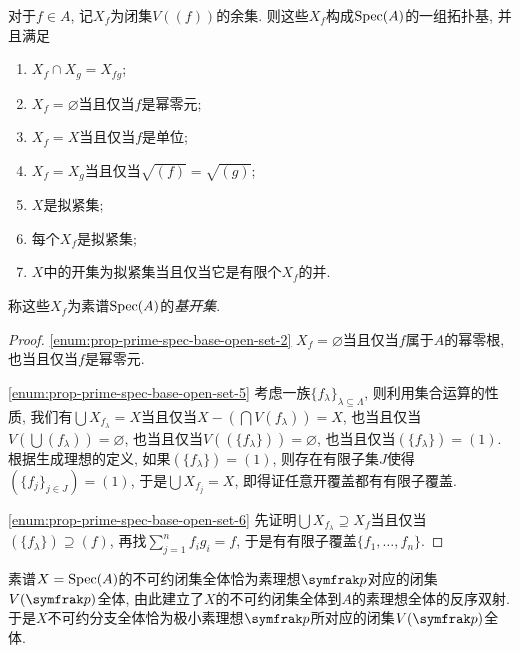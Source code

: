 \begin{proposition}\label{prop:primespecbaseopenset}
  对于$f\in A$, 记$X_f$为闭集$V((f))$的余集. 则这些$X_f$构成$\operatorname{Spec} (A)$的一组拓扑基, 并且满足
  \begin{enumerate}
    \item $X_f\cap X_g=X_{fg}$;
    \item\label{enum:prop-prime-spec-base-open-set-2} $X_f=\varnothing$当且仅当$f$是幂零元;
    \item $X_f=X$当且仅当$f$是单位;
    \item $X_f=X_g$当且仅当$\sqrt{(f)}=\sqrt{(g)}$;
    \item\label{enum:prop-prime-spec-base-open-set-5} $X$是拟紧集\footnotemark;
    \item\label{enum:prop-prime-spec-base-open-set-6} 每个$X_f$是拟紧集;
    \item $X$中的开集为拟紧集当且仅当它是有限个$X_f$的并.
  \end{enumerate}
  称这些$X_f$为素谱$\operatorname{Spec} (A)$的\emph{基开集}.
\end{proposition}

\begin{proof}
  \ref{enum:prop-prime-spec-base-open-set-2} $X_f=\varnothing$当且仅当$f$属于$A$的幂零根, 也当且仅当$f$是幂零元.

  \ref{enum:prop-prime-spec-base-open-set-5} 考虑一族$\{f_\lambda\}_{\lambda\subseteq \Lambda}$, 则利用集合运算的性质, 我们有$\bigcup X_{f_\lambda}=X$当且仅当$X-(\bigcap V(f_\lambda))=X$, 也当且仅当$V(\bigcup (f_\lambda))=\varnothing$, 也当且仅当$V((\{f_\lambda\}))=\varnothing$, 也当且仅当$(\{f_\lambda\})=(1)$. 根据生成理想的定义, 如果$(\{f_\lambda\})=(1)$, 则存在有限子集$J$使得$(\{f_j\}_{j\in J})=(1)$, 于是$\bigcup X_{f_j}=X$, 即得证任意开覆盖都有有限子覆盖.

  \ref{enum:prop-prime-spec-base-open-set-6} 先证明$\bigcup X_{f_\lambda}\supseteq X_f$当且仅当$(\{f_\lambda\})\supseteq (f)$, 再找$\sum_{j=1}^n f_ig_i = f$, 于是有有限子覆盖$\{f_1, \dotsc, f_n\}$.
\end{proof}

\begin{proposition}
  素谱$X=\operatorname{Spec} (A)$的不可约闭集全体恰为素理想$\ideal{p}$对应的闭集$V(\ideal{p})$全体, 由此建立了$X$的不可约闭集全体到$A$的素理想全体的反序双射. 于是$X$不可约分支全体恰为极小素理想$\ideal{p}$所对应的闭集$V(\ideal{p})$全体.
\end{proposition}

